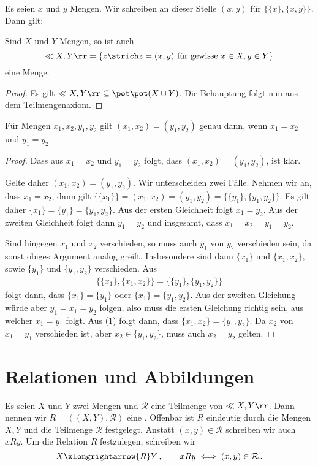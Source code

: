 Es seien $x$ und $y$ Mengen. Wir schreiben an dieser Stelle $(x,y)$ für $\{\{x\},\{x,y\}\}$. Dann gilt:

\begin{lemma}
Sind $X$ und $Y$ Mengen, so ist auch
\[
\ll X,Y\rr=\left\{z\strich z=(x,y)\text{ für gewisse }x\in X,y\in Y\right\}
\]
eine Menge.
\begin{proof}
Es gilt $\ll X,Y\rr\subseteq\pot\pot(X\cup Y)$. Die Behauptung folgt nun aus dem Teilmengenaxiom.
\end{proof}
\end{lemma}

\begin{lemma}
Für Mengen $x_1,x_2,y_1,y_2$ gilt $(x_1,x_2)=(y_1,y_2)$ genau dann, wenn $x_1=x_2$ und $y_1=y_2$.
\begin{proof}
Dass aus $x_1=x_2$ und $y_1=y_2$ folgt, dass $(x_1,x_2)=(y_1,y_2)$, ist klar.

Gelte daher $(x_1,x_2)=(y_1,y_2)$. Wir unterscheiden zwei Fälle. Nehmen wir an, dass $x_1=x_2$, dann gilt $\{\{x_1\}\}=(x_1,x_2)=(y_1,y_2)=\{\{y_1\},\{y_1,y_2\}\}$. Es gilt daher $\{x_1\}=\{y_1\}=\{y_1,y_2\}$. Aus der ersten Gleichheit folgt $x_1=y_2$. Aus der zweiten Gleichheit folgt dann $y_1=y_2$ und insgesamt, dass $x_1=x_2=y_1=y_2$.

Sind hingegen $x_1$ und $x_2$ verschieden, so muss auch $y_1$ von $y_2$ verschieden sein, da sonst obiges Argument analog greift. Insbesondere sind dann $\{x_1\}$ und $\{x_1,x_2\}$, sowie $\{y_1\}$ und $\{y_1,y_2\}$ verschieden. Aus
\begin{align}
\{\{x_1\},\{x_1,x_2\}\}=\{\{y_1\},\{y_1,y_2\}\}
\end{align}
folgt dann, dass $\{x_1\}=\{y_1\}$ oder $\{x_1\}=\{y_1,y_2\}$. Aus der zweiten Gleichung würde aber $y_1=x_1=y_2$ folgen, also muss die ersten Gleichung richtig sein, aus welcher $x_1=y_1$ folgt. Aus (1) folgt dann, dass $\{x_1,x_2\}=\{y_1,y_2\}$. Da $x_2$ von $x_1=y_1$ verschieden ist, aber $x_2\in\{y_1,y_2\}$, muss auch $x_2=y_2$ gelten.
\end{proof}
\end{lemma}

\section{Relationen und Abbildungen}

Es seien $X$ und $Y$ zwei Mengen und $\mathcal{R}$ eine Teilmenge von $\ll X,Y\rr$. Dann nennen wir $R=((X,Y),\mathcal{R})$ eine . Offenbar ist $R$ eindeutig durch die Mengen $X,Y$ und die Teilmenge $\mathcal{R}$ festgelegt. Anstatt $(x,y)\in\mathcal{R}$ schreiben wir auch $xRy$. Um die Relation $R$ festzulegen, schreiben wir
\[
X\xlongrightarrow{R}Y\,,\qquad xRy\iff(x,y)\in\mathcal{R}\,.
\]

